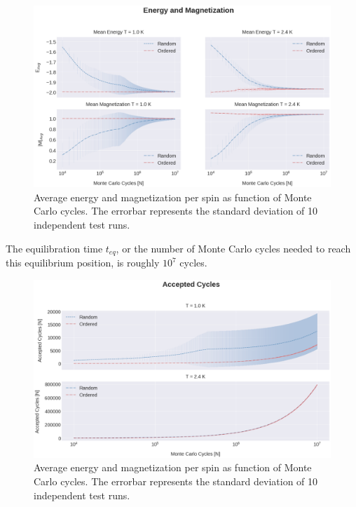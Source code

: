 \documentclass[%
reprint,nofootinbib,
amsmath,amssymb,
aps,
]{revtex4-1}
\begin{document}
\onecolumngrid
\begin{figure} 
	\includegraphics[width = \textwidth]{Figures/4C1.png} 
	\caption{\centering \label{4C1}Average energy and magnetization per spin as function of Monte Carlo cycles. The errorbar represents the standard deviation of 10 independent test runs.}
\end{figure}
\twocolumngrid

The equilibration time $t_{eq}$, or the number of Monte Carlo cycles needed to reach this equilibrium position, is roughly $10^7$ cycles.  


\begin{figure} 
	\includegraphics[width = \textwidth]{Figures/Plot2.png} 
	\caption{\centering \label{4C1}Average energy and magnetization per spin as function of Monte Carlo cycles. The errorbar represents the standard deviation of 10 independent test runs.}
\end{figure}
\end{document}
